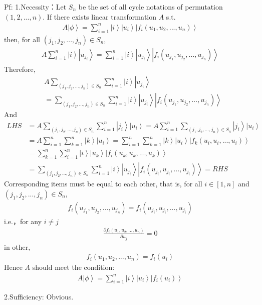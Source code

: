 \documentclass[%
 reprint,
 amsmath,amssymb,
pra,
]{revtex4-1}
\begin{document}
\noindent Pf: 1.Necessity：Let $S_n$ be the set of all cycle notations of permutation $\left(1, 2, ..., n\right)$. If there exists linear transformation $A$ s.t. 
\begin{align*}
	A\left|\phi\right\rangle = \sum_{i=1}^n \left|i\right\rangle\left|u_i\right\rangle\left|f_{i}\left(u_1, u_2, ..., u_n\right)\right\rangle
\end{align*}
then, for all $\left(j_1, j_2, ..., j_n\right)\in S_n$, 
\begin{align*}
	A\sum_{i=1}^n \left|i\right\rangle\left|u_{j_i}\right\rangle = \sum_{i=1}^n \left|i\right\rangle\left|u_{j_i}\right\rangle\left|f_{i}\left(u_{j_1}, u_{j_2}, ..., u_{j_n}\right)\right\rangle
\end{align*}
Therefore,  
\begin{align*}
	&A\sum_{\left(j_1, j_2, ..., j_n\right)\in S_n}\sum_{i=1}^n \left|i\right\rangle\left|u_{j_i}\right\rangle \\
	&=\sum_{\left(j_1, j_2, ..., j_n\right)\in S_n}\sum_{i=1}^n\left|i\right\rangle\left|u_{j_i}\right\rangle\left|f_{i}\left(u_{j_1}, u_{j_2}, ..., u_{j_n}\right)\right\rangle
\end{align*}
And
\begin{align*}
	LHS &= A\sum_{\left(j_1, j_2, ..., j_n\right)\in S_n}\sum_{i=1}^n \left|j_i\right\rangle\left|u_i\right\rangle = A\sum_{i=1}^n\sum_{\left(j_1, j_2, ..., j_n\right)\in S_n}\left|j_i\right\rangle\left|u_i\right\rangle\\
	&= A\sum_{i=1}^n\sum_{k=1}^n\left|k\right\rangle\left|u_i\right\rangle = \sum_{i=1}^n\sum_{k=1}^n\left|k\right\rangle\left|u_i\right\rangle\left|f_{k}\left(u_i, u_i, ..., u_i\right)\right\rangle\\
	&= \sum_{k=1}^n\sum_{i=1}^n\left|i\right\rangle\left|u_k\right\rangle\left|f_{i}\left(u_k, u_k, ..., u_k\right)\right\rangle \\
	&= \sum_{\left(j_1, j_2, ..., j_n\right)\in S_n}\sum_{i=1}^n\left|i\right\rangle\left|u_{j_i}\right\rangle\left|f_{i}\left(u_{j_i}, u_{j_i}, ..., u_{j_i}\right)\right\rangle = RHS
\end{align*}
Corresponding items must be equal to each other, that is, for all $i \in \left[1, n\right]$ and $\left(j_1, j_2, ..., j_n\right)\in S_n$, 
\begin{align*}
	f_{i}\left(u_{j_1}, u_{j_2}, ..., u_{j_n}\right) = f_{i}\left(u_{j_i}, u_{j_i}, ..., u_{j_i}\right)
\end{align*}
i.e.，for any $i\neq j$
\begin{align*}
	\frac{\partial f_i\left(u_1, u_2, ..., u_n\right)}{\partial u_j} = 0
\end{align*}
in other, 
\begin{align*}
	f_i\left(u_1, u_2, ...,u_n\right) = f_i\left(u_i\right)
\end{align*}
Hence $A$ should meet the condition: 
\begin{align*}
	A\left|\phi\right\rangle = \sum_{i=1}^n \left|i\right\rangle\left|u_i\right\rangle\left|f_{i}\left(u_i\right)\right\rangle
\end{align*}

2.Sufficiency: Obvious.\\


\end{document}
